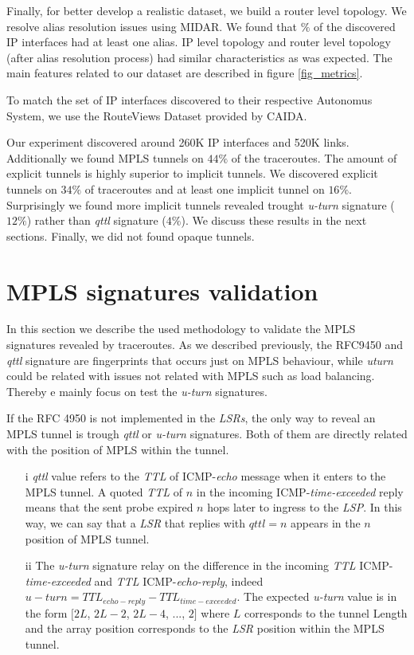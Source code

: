 Finally, for better develop a realistic dataset, we build a router level topology. We resolve alias resolution issues using MIDAR. We found that $ \%$ of the discovered IP interfaces had at least one alias. IP level topology and router level topology (after alias resolution process) had similar characteristics as was expected. The main features related to our dataset are described in figure \ref{fig_metrics}.

To match the set of IP interfaces discovered to their respective Autonomus System, we use the RouteViews Dataset provided by CAIDA. 

Our experiment discovered around 260K IP interfaces and 520K links. Additionally we found MPLS tunnels on  $44\%$ of the traceroutes. The amount of explicit tunnels is highly superior to implicit tunnels. We discovered explicit tunnels on $34\%$ of traceroutes and at least one implicit tunnel on $16\%$. Surprisingly we found more implicit tunnels revealed trought \textit{u-turn} signature ($12\%$) rather than \textit{qttl} signature ($4\%$). We discuss these results in the next sections. Finally, we did not found opaque tunnels.


\section{MPLS signatures validation}

In this section we describe the used methodology to validate the MPLS signatures revealed by traceroutes. As we described previously, the RFC9450 and \textit{qttl} signature are fingerprints that occurs just on MPLS behaviour, while \textit{uturn} could be related with issues not related with MPLS such as load balancing. Thereby e mainly focus on test the \textit{u-turn} signatures. 

If the RFC 4950 is not implemented in the \textit{LSRs}, the only way to reveal an MPLS tunnel is trough \textit{qttl} or \textit{u-turn} signatures. Both of them are directly related with the position of MPLS within the tunnel.  

\begin{itemize}
\item[i] \textit{qttl} value refers to the \textit{TTL} of ICMP-\textit{echo} message when it enters to the MPLS  tunnel. A quoted \textit{TTL} of $n$ in the incoming ICMP-\textit{time-exceeded} reply means that the sent probe expired $n$ hops later to ingress to the \textit{LSP}. In this way, we can say that a \textit{LSR} that replies with $qttl=n$ appears  in the $n$ position of MPLS tunnel.

\item[ii] The \textit{u-turn} signature  relay on the difference in the incoming \textit{TTL} ICMP-\textit{time-exceeded} and \textit{TTL} ICMP-\textit{echo-reply}, indeed  $u-turn= TTL_{echo-reply}-TTL_{time-exceeded}$. The expected \textit{u-turn} value is in the form $[2L$, $2L-2$, $2L-4$, $...$, $2]$ where $L$ corresponds to the tunnel Length and the array position corresponds to the \textit{LSR} position within the MPLS tunnel.
\end{itemize}

